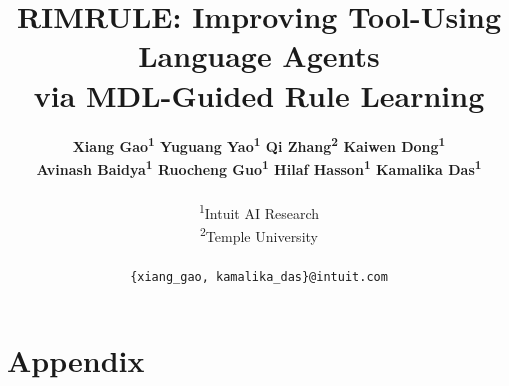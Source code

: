 \documentclass[11pt]{article}
\title{R{\normalsize IM}R{\normalsize ULE}: Improving Tool-Using Language Agents\\via MDL-Guided Rule Learning}
\author{
{\bfseries
Xiang Gao\textsuperscript{1} \quad
Yuguang Yao\textsuperscript{1} \quad
Qi Zhang\textsuperscript{2} \quad
Kaiwen Dong\textsuperscript{1}
}\\
{\bfseries
Avinash Baidya\textsuperscript{1} \quad
Ruocheng Guo\textsuperscript{1} \quad
Hilaf Hasson\textsuperscript{1} \quad
Kamalika Das\textsuperscript{1}
}\\
\\
\textsuperscript{1}Intuit AI Research \\
\textsuperscript{2}Temple University \\
\\
\texttt{\{xiang\_gao, kamalika\_das\}@intuit.com}
}
\begin{document}
\maketitle

\begin{abstract}

\end{abstract}









%











\clearpage
\appendix
\section{Appendix}

\end{document}
